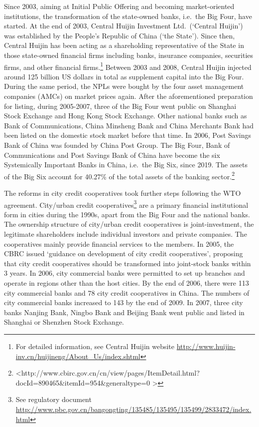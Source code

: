 \documentclass[
  letterpaper,
  DIV=11,
  numbers=noendperiod]{scrreprt}
\begin{document}
Since 2003, aiming at Initial Public Offering and becoming
market-oriented institutions, the transformation of the state-owned
banks, i.e.~the Big Four, have started. At the end of 2003, Central
Huijin Investment Ltd.~(`Central Huijin') was established by the
People's Republic of China (`the State'). Since then, Central Huijin has
been acting as a shareholding representative of the State in those
state-owned financial firms including banks, insurance companies,
securities firms, and other financial firms.\footnote{For detailed
  information, see Central Huijin website
  \url{http://www.huijin-inv.cn/huijineng/About_Us/index.shtml}} Between
2003 and 2008, Central Huijin injected around 125 billion US dollars in
total as supplement capital into the Big Four. During the same period,
the NPLs were bought by the four asset management companies (AMCs) on
market prices again. After the aforementioned preparation for listing,
during 2005-2007, three of the Big Four went public on Shanghai Stock
Exchange and Hong Kong Stock Exchange. Other national banks such as Bank
of Communications, China Minsheng Bank and China Merchants Bank had been
listed on the domestic stock market before that time. In 2006, Post
Savings Bank of China was founded by China Post Group. The Big Four,
Bank of Communications and Post Savings Bank of China have become the
six Systemically Important Banks in China, i.e.~the Big Six, since 2019.
The assets of the Big Six account for 40.27\% of the total assets of the
banking sector.\footnote{\textless http://www.cbirc.gov.cn/cn/view/pages/ItemDetail.html?docId=890465\&itemId=954\&generaltype=0
  \textgreater{}}

The reforms in city credit cooperatives took further steps following the
WTO agreement. City/urban credit cooperatives\footnote{See regulatory
  document
  \url{http://www.pbc.gov.cn/bangongting/135485/135495/135499/2833472/index.html}}
are a primary financial institutional form in cities during the 1990s,
apart from the Big Four and the national banks. The ownership structure
of city/urban credit cooperatives is joint-investment, the legitimate
shareholders include individual investors and private companies. The
cooperatives mainly provide financial services to the members. In 2005,
the CBRC issued `guidance on development of city credit cooperatives',
proposing that city credit cooperatives should be transformed into
joint-stock banks within 3 years. In 2006, city commercial banks were
permitted to set up branches and operate in regions other than the host
cities. By the end of 2006, there were 113 city commercial banks and 78
city credit cooperatives in China. The numbers of city commercial banks
increased to 143 by the end of 2009. In 2007, three city banks Nanjing
Bank, Ningbo Bank and Beijing Bank went public and listed in Shanghai or
Shenzhen Stock Exchange.
\end{document}
